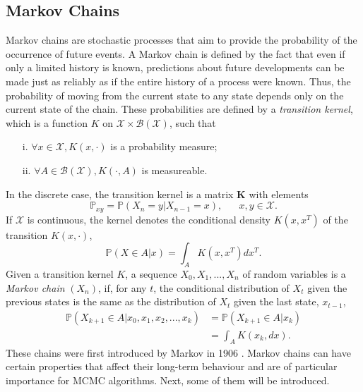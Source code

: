 \subsection{Markov Chains}
Markov chains are stochastic processes that aim to provide the probability of the occurrence of future events. A Markov chain is defined by the fact that even if only a limited history is known, predictions about future developments can be made just as reliably as if the entire history of a process were known. Thus, the probability of moving from the current state to any state depends only on the current state of the chain. These probabilities are defined by a \textit{transition kernel}, which is a function $K$ on $\mathcal{X} \times \mathcal{B}\left(\mathcal{X}\right)$, such that
\begin{itemize}
    \item[i.] $\forall x\in\mathcal{X}, K\left(x, \cdot\right)$ is a probability measure;
    \item[ii.] $\forall A\in \mathcal{B}\left(\mathcal{X}\right), K\left(\cdot, A\right)$ is measureable.
\end{itemize}
In the discrete case, the transition kernel is a matrix $\pmb{K}$ with elements
\begin{equation*}
    \mathbb{P}_{xy}=\mathbb{P}\left(X_n=y|X_{n-1}=x\right), \hspace{20pt}x,y\in\mathcal{X}.
\end{equation*}
If $\mathcal{X}$ is continuous, the kernel denotes the conditional density $K\left(x,x^T\right)$ of the transition $K\left(x,\cdot\right)$,
\begin{equation*}
    \mathbb{P}\left(X\in A|x\right)=\int_AK\left(x,x^T\right)dx^T.
\end{equation*}
Given a transition kernel $K$, a sequence $X_0,X_1,...,X_n$ of random variables is a \textit{Markov chain} $\left(X_n\right)$, if, for any $t$, the conditional distribution of $X_t$ given the previous states is the same as the distribution of $X_t$ given the last state, $x_{t-1}$,
\begin{align}
    \mathbb{P}\left(X_{k+1}\in A|x_0,x_1,x_2,...,x_k\right) &= \mathbb{P}\left(X_{k+1}\in A|x_k\right) \nonumber\\
    &= \int_A K\left(x_k, dx\right). 
\end{align}
These chains were first introduced by Markov in 1906 \autocite[][]{markov1906extension}. Markov chains can have certain properties that affect their long-term behaviour and are of particular importance for MCMC algorithms. Next, some of them will be introduced.

